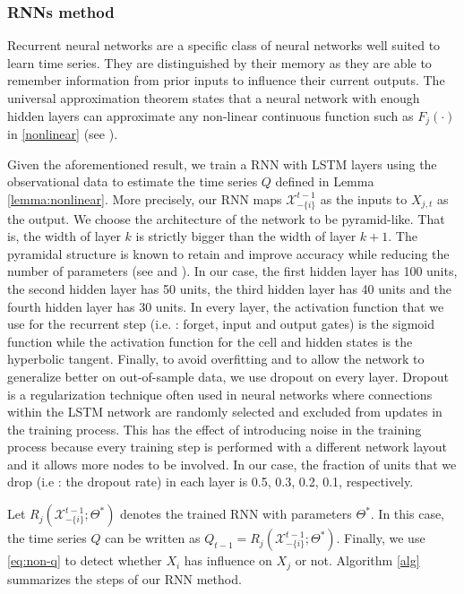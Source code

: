 \subsubsection{RNNs method}
 Recurrent neural networks are a specific class of neural networks well suited to learn time series. 
 They are distinguished by their memory as they are able to remember information from prior inputs to influence their current outputs.
 The universal approximation theorem states that a neural network with enough hidden layers can approximate any non-linear continuous function such as $F_j(\cdot)$ in \eqref{nonlinear} (see \citet{HORNIK1989359}). 
 
Given the aforementioned result, we train a RNN with LSTM layers using the observational data to estimate the time series $Q$ defined in Lemma \ref{lemma:nonlinear}.
 More precisely, our RNN maps $\mathcal{X}_{-\{i\}}^{t-1}$ as the inputs to $X_{j,t}$ as the output. We choose the architecture of the network to be pyramid-like. That is, the width of layer $k$ is strictly bigger than the width of layer $k+1$. The pyramidal structure is known to retain and improve accuracy while reducing the number of parameters (see \citet{ullah2016pyramid} and \citet{TRIPATHY2018565}). In our case, the first hidden layer has 100 units, the second hidden layer has 50 units, the third hidden layer has 40 units and the fourth hidden layer has 30 units. In every layer, the activation function that we use for the recurrent step (i.e. : forget, input and output gates) is the sigmoid function while the activation function for the cell and hidden states is the hyperbolic tangent. Finally, to avoid overfitting and to allow the network to generalize better on out-of-sample data, we use dropout on every layer. Dropout is a regularization technique often used in neural networks where connections within the LSTM network are randomly selected and excluded from updates in the training process. This has the effect of introducing noise in the training process because every training step is performed with a different network layout and it allows more nodes to be involved. In our case, the fraction of units that we drop (i.e : the dropout rate) in each layer is 0.5, 0.3, 0.2, 0.1, respectively.
 
Let $R_j(\mathcal{X}_{-\{i\}}^{t-1};\Theta^*)$ denotes the trained RNN with parameters $\Theta^*$. 
 In this case, the time series $Q$ can be written as  $Q_{t-1}=R_{j}(\mathcal{X}_{-\{i\}}^{t-1};\Theta^*)$.
 Finally, we use \eqref{eq:non-q} to detect whether $X_i$ has influence on $X_j$ or not. 
 Algorithm \ref{alg}  summarizes the steps of our RNN method.

